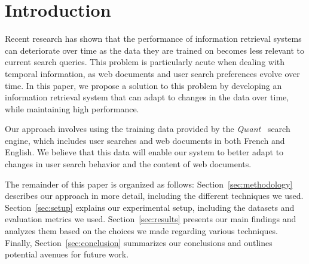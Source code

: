 \enlargethispage{2\baselineskip}
\section{Introduction}
\label{sec:introduction}

Recent research has shown that the performance of information retrieval systems can deteriorate over time as the data they are trained on becomes less relevant to current search queries. 
This problem is particularly acute when dealing with temporal information, as web documents and user search preferences evolve over time. 
In this paper, we propose a solution to this problem by developing an information retrieval system that can adapt to changes in the data over time, while maintaining high performance.

Our approach involves using the training data provided by the \textit{Qwant}~\cite{qwant} search engine, which includes user searches and web documents in both French and English.
We believe that this data will enable our system to better adapt to changes in user search behavior and the content of web documents.

The remainder of this paper is organized as follows: 
Section~\ref{sec:methodology} describes our approach in more detail, including the different techniques we used. 
Section~\ref{sec:setup} explains our experimental setup, including the datasets and evaluation metrics we used. 
Section~\ref{sec:results} presents our main findings and analyzes them based on the choices we made regarding various techniques. 
Finally, Section~\ref{sec:conclusion} summarizes our conclusions and outlines potential avenues for future work.